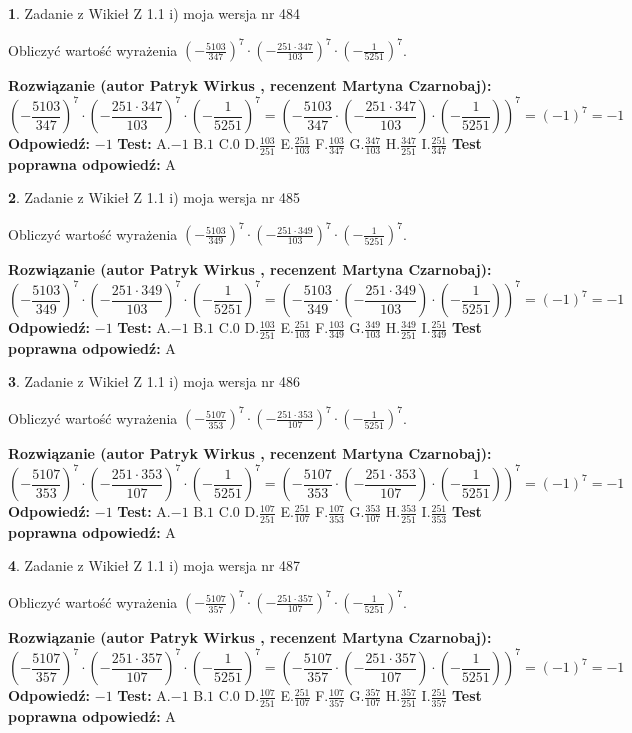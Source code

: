 \documentclass[12pt, a4paper]{article}
\theoremstyle{definition} %
\newtheorem{zad}{}
\newcommand{\zadStart}[1]{\begin{zad}#1\newline}
\newcommand{\zadStop}{\end{zad}}
\newcommand{\rozwStart}[2]{\noindent \textbf{Rozwiązanie (autor #1 , recenzent #2): }\newline}
\newcommand{\rozwStop}{\newline}
\newcommand{\odpStart}{\noindent \textbf{Odpowiedź:}\newline}
\newcommand{\odpStop}{\newline}
\newcommand{\testStart}{\noindent \textbf{Test:}\newline}
\newcommand{\testStop}{\newline}
\newcommand{\kluczStart}{\noindent \textbf{Test poprawna odpowiedź:}\newline}
\newcommand{\kluczStop}{\newline}
\begin{document}
\zadStart{Zadanie z Wikieł Z 1.1 i) moja wersja nr 484}

Obliczyć wartość wyrażenia $(-\frac{5103}{347})^{7} \cdot (-\frac{251 \cdot 347}{103})^{7} \cdot (-\frac{1}{5251})^{7}$.
\zadStop
\rozwStart{Patryk Wirkus}{Martyna Czarnobaj}
$$(-\frac{5103}{347})^{7} \cdot (-\frac{251 \cdot 347}{103})^{7} \cdot (-\frac{1}{5251})^{7} = (-\frac{5103}{347} \cdot (-\frac{251 \cdot 347}{103}) \cdot (-\frac{1}{5251}))^{7} = (-1)^{7} = -1$$
\rozwStop
\odpStart
$-1$
\odpStop
\testStart
A.$-1$ B.$1$ C.$0$ D.$\frac{103}{251}$ E.$\frac{251}{103}$
F.$\frac{103}{347}$ G.$\frac{347}{103}$
H.$\frac{347}{251}$
I.$\frac{251}{347}$
\testStop
\kluczStart
A
\kluczStop



\zadStart{Zadanie z Wikieł Z 1.1 i) moja wersja nr 485}

Obliczyć wartość wyrażenia $(-\frac{5103}{349})^{7} \cdot (-\frac{251 \cdot 349}{103})^{7} \cdot (-\frac{1}{5251})^{7}$.
\zadStop
\rozwStart{Patryk Wirkus}{Martyna Czarnobaj}
$$(-\frac{5103}{349})^{7} \cdot (-\frac{251 \cdot 349}{103})^{7} \cdot (-\frac{1}{5251})^{7} = (-\frac{5103}{349} \cdot (-\frac{251 \cdot 349}{103}) \cdot (-\frac{1}{5251}))^{7} = (-1)^{7} = -1$$
\rozwStop
\odpStart
$-1$
\odpStop
\testStart
A.$-1$ B.$1$ C.$0$ D.$\frac{103}{251}$ E.$\frac{251}{103}$
F.$\frac{103}{349}$ G.$\frac{349}{103}$
H.$\frac{349}{251}$
I.$\frac{251}{349}$
\testStop
\kluczStart
A
\kluczStop



\zadStart{Zadanie z Wikieł Z 1.1 i) moja wersja nr 486}

Obliczyć wartość wyrażenia $(-\frac{5107}{353})^{7} \cdot (-\frac{251 \cdot 353}{107})^{7} \cdot (-\frac{1}{5251})^{7}$.
\zadStop
\rozwStart{Patryk Wirkus}{Martyna Czarnobaj}
$$(-\frac{5107}{353})^{7} \cdot (-\frac{251 \cdot 353}{107})^{7} \cdot (-\frac{1}{5251})^{7} = (-\frac{5107}{353} \cdot (-\frac{251 \cdot 353}{107}) \cdot (-\frac{1}{5251}))^{7} = (-1)^{7} = -1$$
\rozwStop
\odpStart
$-1$
\odpStop
\testStart
A.$-1$ B.$1$ C.$0$ D.$\frac{107}{251}$ E.$\frac{251}{107}$
F.$\frac{107}{353}$ G.$\frac{353}{107}$
H.$\frac{353}{251}$
I.$\frac{251}{353}$
\testStop
\kluczStart
A
\kluczStop



\zadStart{Zadanie z Wikieł Z 1.1 i) moja wersja nr 487}

Obliczyć wartość wyrażenia $(-\frac{5107}{357})^{7} \cdot (-\frac{251 \cdot 357}{107})^{7} \cdot (-\frac{1}{5251})^{7}$.
\zadStop
\rozwStart{Patryk Wirkus}{Martyna Czarnobaj}
$$(-\frac{5107}{357})^{7} \cdot (-\frac{251 \cdot 357}{107})^{7} \cdot (-\frac{1}{5251})^{7} = (-\frac{5107}{357} \cdot (-\frac{251 \cdot 357}{107}) \cdot (-\frac{1}{5251}))^{7} = (-1)^{7} = -1$$
\rozwStop
\odpStart
$-1$
\odpStop
\testStart
A.$-1$ B.$1$ C.$0$ D.$\frac{107}{251}$ E.$\frac{251}{107}$
F.$\frac{107}{357}$ G.$\frac{357}{107}$
H.$\frac{357}{251}$
I.$\frac{251}{357}$
\testStop
\kluczStart
A
\kluczStop
\end{document}
